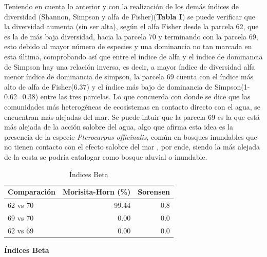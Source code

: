 \documentclass[conference,final,12pt,]{IEEEtran}
\begin{document}
Teniendo en cuenta lo anterior y con la realización de los demás índices
de diversidad (Shannon, Simpson y alfa de Fisher)(\textbf{Tabla I}) se
puede verificar que la diversidad aumenta (sin ser alta), según el alfa
Fisher desde la parcela 62, que es la de más baja diversidad, hacia la
parcela 70 y terminando con la parcela 69, esto debido al mayor número
de especies y una dominancia no tan marcada en esta última, comprobando
así que entre el índice de alfa y el índice de dominancia de Simpson hay
una relación inversa, es decir, a mayor índice de diversidad alfa menor
índice de dominancia de simpson, la parcela 69 cuenta con el índice más
alto de alfa de Fisher(6.37) y el índice más bajo de dominancia de
Simpson(1-0.62=0.38) entre las tres parcelas. Lo que concuerda 
con \citep{Z} donde se dice que las comunidades más heterogéneas
de ecosistemas en contacto directo con el agua, se encuentran más
alejadas del mar. Se puede intuir que la parcela 69 es la
que está más alejada de la acción salobre del agua, algo que afirma esta
idea es la presencia de la especie \emph{Pterocarpus officinalis}, común 
en bosques inundables que no tienen contacto con el
efecto salobre del mar \citep{Y}, por ende, siendo la
más alejada de la costa se podría catalogar como bosque
aluvial o inundable.

\begin{table}[htb]

\caption{\label{tab:unnamed-chunk-3}Índices Beta}
\centering
\begin{tabular}[t]{l|r|r}
\hline
Comparación & Morisita-Horn (\%) & Sorensen\\
\hline
62 vs 70 & 99.44 & 0.8\\
\hline
69 vs 70 & 0.00 & 0.0\\
\hline
62 vs 69 & 0.00 & 0.0\\
\hline
\end{tabular}
\end{table}

\textbf{Índices Beta}
\end{document}
